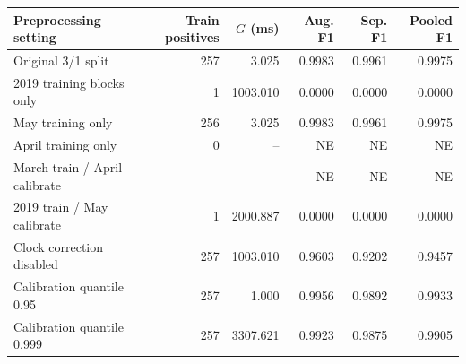 \begin{tabularx}{\linewidth}{@{}Yrrrrr@{}}\toprule
Preprocessing setting & Train positives & $G$ (ms) & Aug. F1 & Sep. F1 & Pooled F1 \\\midrule
Original 3/1 split & 257 & 3.025 & 0.9983 & 0.9961 & 0.9975 \\
2019 training blocks only & 1 & 1003.010 & 0.0000 & 0.0000 & 0.0000 \\
May training only & 256 & 3.025 & 0.9983 & 0.9961 & 0.9975 \\
April training only & 0 & -- & NE & NE & NE \\
March train / April calibrate & -- & -- & NE & NE & NE \\
2019 train / May calibrate & 1 & 2000.887 & 0.0000 & 0.0000 & 0.0000 \\
Clock correction disabled & 257 & 1003.010 & 0.9603 & 0.9202 & 0.9457 \\
Calibration quantile 0.95 & 257 & 1.000 & 0.9956 & 0.9892 & 0.9933 \\
Calibration quantile 0.999 & 257 & 3307.621 & 0.9923 & 0.9875 & 0.9905 \\
\bottomrule\end{tabularx}
